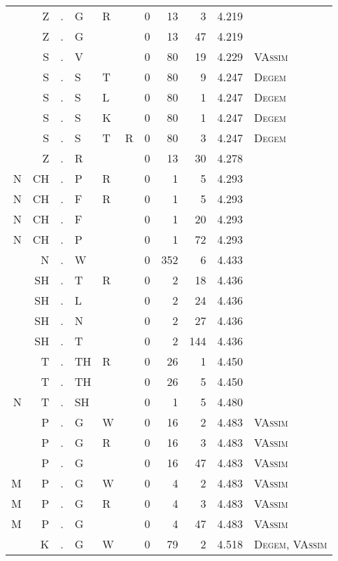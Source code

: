 \begin{longtable}{r@{ } r@{ } c@{ } l@{ } l@{ } l@{ } r r r r l }
  & Z & . & G & R &   & 0 & 13 & 3 & 4.219 &  \\
  & Z & . & G &   &   & 0 & 13 & 47 & 4.219 &  \\
  & S & . & V &   &   & 0 & 80 & 19 & 4.229 & \textsc{VAssim} \\
  & S & . & S & T &   & 0 & 80 & 9 & 4.247 & \textsc{Degem} \\
  & S & . & S & L &   & 0 & 80 & 1 & 4.247 & \textsc{Degem} \\
  & S & . & S & K &   & 0 & 80 & 1 & 4.247 & \textsc{Degem} \\
  & S & . & S & T & R & 0 & 80 & 3 & 4.247 & \textsc{Degem} \\
  & Z & . & R &   &   & 0 & 13 & 30 & 4.278 &  \\
N & CH & . & P & R &   & 0 & 1 & 5 & 4.293 &  \\
N & CH & . & F & R &   & 0 & 1 & 5 & 4.293 &  \\
N & CH & . & F &   &   & 0 & 1 & 20 & 4.293 &  \\
N & CH & . & P &   &   & 0 & 1 & 72 & 4.293 &  \\
  & N & . & W &   &   & 0 & 352 & 6 & 4.433 &  \\
  & SH & . & T & R &   & 0 & 2 & 18 & 4.436 &  \\
  & SH & . & L &   &   & 0 & 2 & 24 & 4.436 &  \\
  & SH & . & N &   &   & 0 & 2 & 27 & 4.436 &  \\
  & SH & . & T &   &   & 0 & 2 & 144 & 4.436 &  \\
  & T & . & TH & R &   & 0 & 26 & 1 & 4.450 &  \\
  & T & . & TH &   &   & 0 & 26 & 5 & 4.450 &  \\
N & T & . & SH &   &   & 0 & 1 & 5 & 4.480 &  \\
  & P & . & G & W &   & 0 & 16 & 2 & 4.483 & \textsc{VAssim} \\
  & P & . & G & R &   & 0 & 16 & 3 & 4.483 & \textsc{VAssim} \\
  & P & . & G &   &   & 0 & 16 & 47 & 4.483 & \textsc{VAssim} \\
M & P & . & G & W &   & 0 & 4 & 2 & 4.483 & \textsc{VAssim} \\
M & P & . & G & R &   & 0 & 4 & 3 & 4.483 & \textsc{VAssim} \\
M & P & . & G &   &   & 0 & 4 & 47 & 4.483 & \textsc{VAssim} \\
  & K & . & G & W &   & 0 & 79 & 2 & 4.518 & \textsc{Degem}, \textsc{VAssim} \\

\end{longtable}
